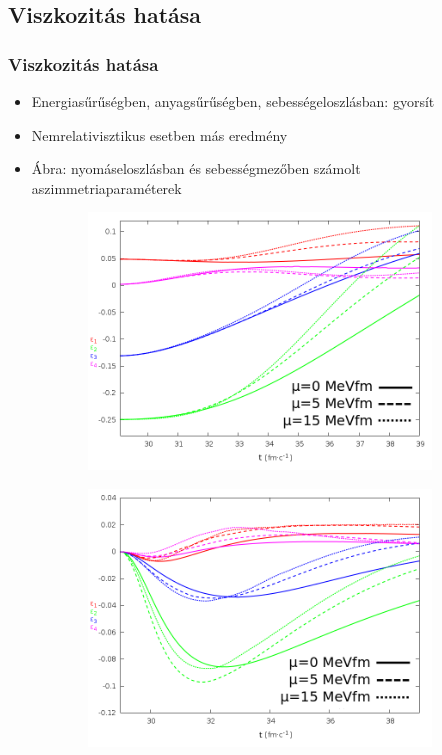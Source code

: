 \documentclass{beamer}
\begin{document}
\subsection{Viszkozitás hatása}
\begin{frame}
\frametitle{Viszkozitás hatása}
\begin{center}
\begin{itemize}
  \setlength{\itemsep}{12pt}

\item<1-> Energiasűrűségben, anyagsűrűségben, sebességeloszlásban: gyorsít
\item<1-> Nemrelativisztikus esetben más eredmény
\item<1-> Ábra: nyomáseloszlásban és sebességmezőben számolt aszimmetriaparaméterek 
\end{itemize}
\begin{figure}[H]
	\centering
    \begin{subfigure}[b]{0.49\textwidth}
    		\includegraphics[width=\textwidth]{pic/new/relvisc_e}
	\end{subfigure}
	\begin{subfigure}[b]{0.49\textwidth}
        	\includegraphics[width=\textwidth]{pic/new/relvisc_v}

\end{subfigure}
\end{figure}
\end{center}
\end{frame}
\end{document}
